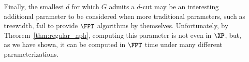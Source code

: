 Finally, the smallest $d$ for which $G$ admits a $d$-cut may be an interesting additional parameter to be considered when more traditional parameters, such as treewidth, fail to provide $\FPT$ algorithms by themselves.
Unfortunately, by Theorem~\ref{thm:regular_nph}, computing this parameter is not even in $\XP$, but, as we have shown, it can be computed in $\FPT$ time under many different parameterizations. 
